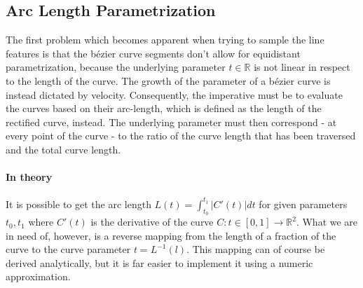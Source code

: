 \subsection{Arc Length Parametrization}
The first problem which becomes apparent when trying to sample the line features is that the b\'{e}zier curve segments don't allow for equidistant parametrization, because the underlying parameter $t \in \mathbb{R}$ is not linear in respect to the length of the curve. The growth of the parameter of a b\'{e}zier curve is instead dictated by velocity. Consequently, the imperative must be to evaluate the curves based on their arc-length, which is defined as the length of the rectified curve, instead. The underlying parameter must then correspond - at every point of the curve - to the ratio of the curve length
that has been traversed and the total curve length.

\paragraph{In theory}
It is possible to get the arc length $L(t)=\int_{t_{0}}^{t_{1}} \left|C'(t)\right| dt$ for given parameters $t_{0}, t_{1}$ where $C'(t)$ is the derivative of the curve $C:t \in [0,1] \rightarrow \mathbb{R}^2$. What we are in need of, however, is a reverse mapping from the length of a fraction of the curve to the curve parameter $t = L^{-1}(l)$. 
This mapping can of course be derived analytically, but it is far easier to implement it using a numeric approximation. 

